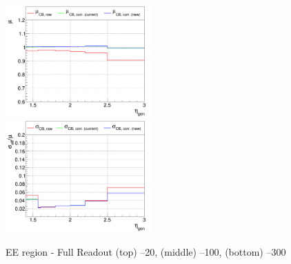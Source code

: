\begin{figure}
\includegraphics[width=0.495\textwidth]{./plots_pdf/ECAL_plots/plotsNoPU/EE/pdf/FULL/GENETA/EEFULL_GENETA_0100_0300_MuOverBins.pdf}
\includegraphics[width=0.495\textwidth]{./plots_pdf/ECAL_plots/plotsNoPU/EE/pdf/FULL/GENETA/EEFULL_GENETA_0100_0300_EffSigmaOverBins.pdf}

\caption{EE region - Full Readout (top) --20\GeV , (middle) --100\GeV, (bottom) --300\GeV}
\label{fig:NOPU_EEFULL_eta}
\end{figure}








